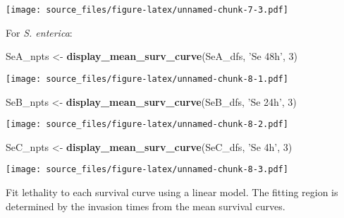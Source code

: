 \documentclass[]{article}
\newenvironment{Shaded}{\begin{snugshade}}{\end{snugshade}}
\newcommand{\KeywordTok}[1]{\textcolor[rgb]{0.13,0.29,0.53}{\textbf{#1}}}
\newcommand{\DecValTok}[1]{\textcolor[rgb]{0.00,0.00,0.81}{#1}}
\newcommand{\StringTok}[1]{\textcolor[rgb]{0.31,0.60,0.02}{#1}}
\newcommand{\NormalTok}[1]{#1}
\begin{document}
\texttt{[image: source\_files/figure-latex/unnamed-chunk-7-3.pdf]}

For \emph{S. enterica}:

\begin{Shaded}
\begin{Highlighting}[]
\NormalTok{SeA_npts <-}\StringTok{ }\KeywordTok{display_mean_surv_curve}\NormalTok{(SeA_dfs, }\StringTok{'Se 48h'}\NormalTok{, }\DecValTok{3}\NormalTok{)}
\end{Highlighting}
\end{Shaded}

\texttt{[image: source\_files/figure-latex/unnamed-chunk-8-1.pdf]}

\begin{Shaded}
\begin{Highlighting}[]
\NormalTok{SeB_npts <-}\StringTok{ }\KeywordTok{display_mean_surv_curve}\NormalTok{(SeB_dfs, }\StringTok{'Se 24h'}\NormalTok{, }\DecValTok{3}\NormalTok{)}
\end{Highlighting}
\end{Shaded}

\texttt{[image: source\_files/figure-latex/unnamed-chunk-8-2.pdf]}

\begin{Shaded}
\begin{Highlighting}[]
\NormalTok{SeC_npts <-}\StringTok{ }\KeywordTok{display_mean_surv_curve}\NormalTok{(SeC_dfs, }\StringTok{'Se 4h'}\NormalTok{, }\DecValTok{3}\NormalTok{)}
\end{Highlighting}
\end{Shaded}

\texttt{[image: source\_files/figure-latex/unnamed-chunk-8-3.pdf]}

Fit lethality to each survival curve using a linear model. The fitting
region is determined by the invasion times from the mean survival
curves.
\end{document}
